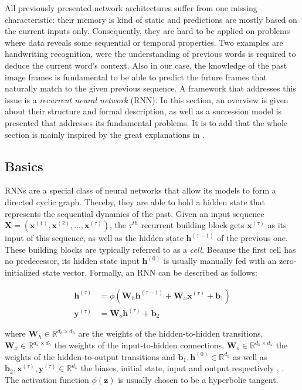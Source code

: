 All previously presented network architectures suffer from one missing characteristic: their memory is kind of static and predictions are mostly based on the current inputs only. Consequently, they are hard to be applied on problems where data reveals some sequential or temporal properties. Two examples are handwriting recognition, were the understanding of previous words is required to deduce the current word's context. Also in our case, the knowledge of the past image frames is fundamental to be able to predict the future frames that naturally match to the given previous sequence. A framework that addresses this issue is a \textit{recurrent neural network} (RNN). In this section, an overview is given about their structure and formal description, as well as a succession model is presented that addresses its fundamental problems. It is to add that the whole section is mainly inspired by the great explanations in \parencite{understand_lstm}.


\subsection{Basics}

RNNs are a special class of neural networks that allow its models to form a directed cyclic graph. Thereby, they are able to hold a hidden state that represents the sequential dynamics of the past. Given an input sequence $ \textbf{X} = (\textbf{x}^{(1)}, \textbf{x}^{(2)},..., \textbf{x}^{(\tau)}) $, the $ \tau^{th} $ recurrent building block gets $\textbf{x}^{(\tau)}$ as its input of this sequence, as well as the hidden state $\textbf{h}^{(\tau-1)}$ of the previous one. These building blocks are typically referred to as a \textit{cell}. Because the first cell has no predecessor, its hidden state input $ \textbf{h}^{(0)} $ is usually manually fed with an zero-initialized state vector. Formally, an RNN can be described as follows:

\begin{equation} \label{eq:rnn}
\begin{aligned}
\textbf{h}^{(\tau)} &= \phi(\textbf{W}_{h} \textbf{h}^{(\tau-1)} + \textbf{W}_{x} \textbf{x}^{(\tau)} + \textbf{b}_1) \\
\textbf{y}^{(\tau)} &= \textbf{W}_{o} \textbf{h}^{(\tau)} + \textbf{b}_2
\end{aligned}
\end{equation}

where $ \textbf{W}_{h} \in \mathbb{R}^{d_h \times d_h} $ are the weights of the hidden-to-hidden transitions, $ \textbf{W}_{x} \in \mathbb{R}^{d_x \times d_h} $ the weights of the input-to-hidden connections, $ \textbf{W}_{o} \in \mathbb{R}^{d_h \times d_x} $ the weights of the hidden-to-output transitions and $ \textbf{b}_1, \textbf{h}^{(0)} \in \mathbb{R}^{d_h}$ as well as $\textbf{b}_2, \textbf{x}^{(\tau)}, \textbf{y}^{(\tau)} \in \mathbb{R}^{d_x} $ the biases, initial state, input and output respectively \parencite[p. 2]{rnn-batchnorm}, \parencite[p. 381]{deep_learning}. The activation function $ \phi(\textbf{z}) $ is usually chosen to be a hyperbolic tangent.

